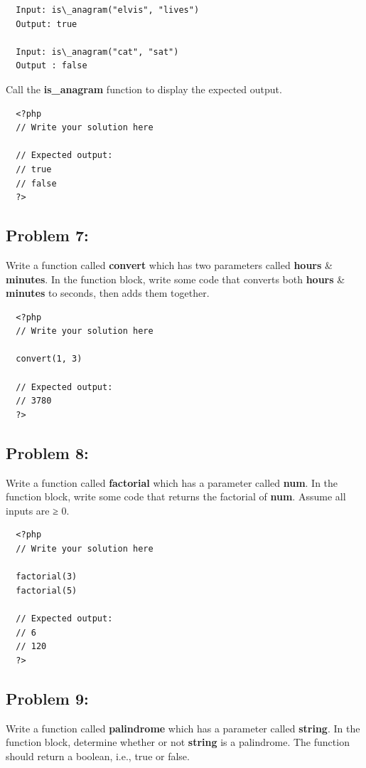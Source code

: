 \documentclass{article}
\begin{document}
\begin{verbatim}
  Input: is\_anagram("elvis", "lives")
  Output: true

  Input: is\_anagram("cat", "sat")
  Output : false
\end{verbatim}

Call the \textbf{is\_anagram} function to display the expected output.

\begin{verbatim}
  <?php  
  // Write your solution here

  // Expected output:
  // true
  // false
  ?>
\end{verbatim}

\subsection*{Problem 7:}
Write a function called \textbf{convert} which has two parameters called \textbf{hours} \& \textbf{minutes}. In the function block, write some code that converts both \textbf{hours} \& \textbf{minutes} to seconds, then adds them together.

\begin{verbatim}
  <?php  
  // Write your solution here

  convert(1, 3)

  // Expected output:
  // 3780
  ?>
\end{verbatim}

\subsection*{Problem 8:}
Write a function called \textbf{factorial} which has a parameter called \textbf{num}. In the function block, write some code that returns the factorial of \textbf{num}. Assume all inputs are ≥ 0. 

\begin{verbatim}
  <?php  
  // Write your solution here

  factorial(3)
  factorial(5)

  // Expected output:
  // 6
  // 120
  ?>
\end{verbatim}

\subsection*{Problem 9:}
Write a function called \textbf{palindrome} which has a parameter called \textbf{string}. In the function block, determine whether or not \textbf{string} is a palindrome. The function should return a boolean, i.e., true or false. \\ \\
\end{document}

